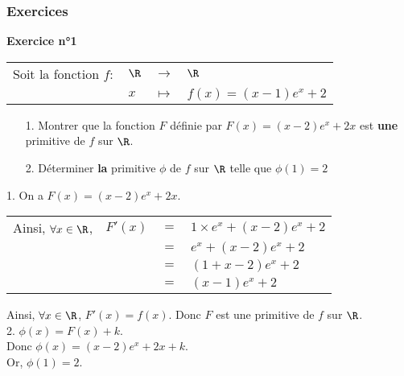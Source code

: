 \newpage

\subsubsection{Exercices}

\textbf{Exercice n°1} \\

\begin{tabular}{llll}
Soit la fonction $f:$ & $\R$ & $\longrightarrow$ & $\R$ \\
& $x$ & $\longmapsto$ & $f(x) = \left(x-1\right)e^x + 2$ \\
\end{tabular}

\vspace*{.3cm}

\begin{itemize}
\item[1.] Montrer que la fonction $F$ définie par $F(x) = \left(x-2\right)e^x + 2x$ est \textbf{une} primitive de $f$ sur $\R$. \\
\item[2.] Déterminer \textbf{la} primitive $\phi$ de $f$ sur $\R$ telle que $\phi\left(1\right) = 2$ \\
\end{itemize}

\vspace*{.3cm}

1. On a $F(x) = \left(x-2\right)e^x + 2x$. \\

\begin{tabular}{llll}
Ainsi, $\forall x \in \R$, & $F'(x)$ & $=$ & $1 \times e^x + \left(x-2\right)e^x + 2$ \\
& & $=$ & $e^x + \left(x-2\right)e^x + 2$ \\
& & $=$ & $\left(1 + x - 2\right)e^x + 2$ \\
& & $=$ & $\left(x-1\right)e^x + 2$ \\
\end{tabular}

Ainsi, $\forall x \in \R$, $F'(x) = f(x)$. Donc $F$ est une primitive de $f$ sur $\R$. \\

2. $\phi\left(x\right) = F\left(x\right) + k$. \\

Donc $\phi\left(x\right) = \left(x-2\right)e^x + 2x + k$. \\

Or, $\phi\left(1\right) = 2$. \\

